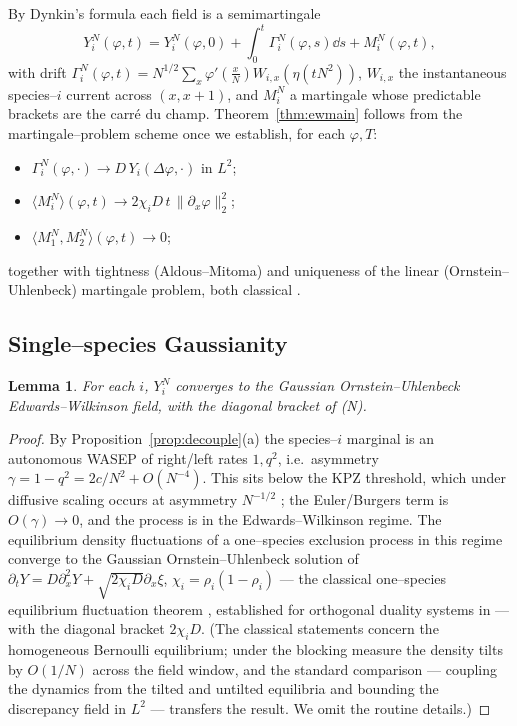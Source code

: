 \documentclass[11pt]{article}
\theoremstyle{plain}
\newtheorem{lemma}[theorem]{Lemma}
\theoremstyle{definition}
\theoremstyle{remark}
\begin{document}
By Dynkin's formula \cite[App.~1.5]{KL} each field is a semimartingale
\begin{equation}\label{eq:dynkin}
  Y_i^N(\varphi,t)=Y_i^N(\varphi,0)+\int_0^t\Gamma_i^N(\varphi,s)\dd s+M_i^N(\varphi,t),
\end{equation}
with drift $\Gamma_i^N(\varphi,t)=N^{1/2}\sum_x\varphi'(\tfrac xN)W_{i,x}(\eta(tN^2))$,
$W_{i,x}$ the instantaneous species--$i$ current across $(x,x{+}1)$, and $M_i^N$ a
martingale whose predictable brackets are the carr\'e du champ. Theorem~\ref{thm:ewmain}
follows from the martingale--problem scheme \cite[Ch.~11]{KL} once we establish, for
each $\varphi,T$:
\begin{itemize}
\item[\textup{(D)}] $\Gamma_i^N(\varphi,\cdot)\to D\,Y_i(\Delta\varphi,\cdot)$ in $L^2$;
\item[\textup{(N)}] $\langle M_i^N\rangle(\varphi,t)\to 2\chi_i D\,t\,\|\partial_x\varphi\|_2^2$;
\item[\textup{(X)}] $\langle M_1^N,M_2^N\rangle(\varphi,t)\to0$;
\end{itemize}
together with tightness (Aldous--Mitoma) and uniqueness of the linear
(Ornstein--Uhlenbeck) martingale problem, both classical \cite[Ch.~11]{KL}.

\subsection{Single--species Gaussianity}
\begin{lemma}\label{lem:gauss}
For each $i$, $Y_i^N$ converges to the Gaussian Ornstein--Uhlenbeck
Edwards--Wilkinson field, with the diagonal bracket of \textup{(N)}.
\end{lemma}
\begin{proof}
By Proposition~\ref{prop:decouple}(a) the species--$i$ marginal is an autonomous WASEP
of right/left rates $1,q^2$, i.e.\ asymmetry $\gamma=1-q^2=2c/N^2+O(N^{-4})$. This sits
below the KPZ threshold, which under diffusive scaling occurs at asymmetry $N^{-1/2}$
\cite{GJ}; the Euler/Burgers term is $O(\gamma)\to0$, and the process is in the
Edwards--Wilkinson regime. The equilibrium density fluctuations of a one--species
exclusion process in this regime converge to the Gaussian Ornstein--Uhlenbeck solution
of $\partial_tY=D\partial_x^2Y+\sqrt{2\chi_i D}\partial_x\xi$, $\chi_i=\rho_i(1-\rho_i)$
--- the classical one--species equilibrium fluctuation theorem \cite[Ch.~11]{KL},
established for orthogonal duality systems in \cite{ACR2} --- with the diagonal bracket
$2\chi_i D$. (The classical statements concern the homogeneous Bernoulli equilibrium;
under the blocking measure the density tilts by $O(1/N)$ across the field window, and
the standard comparison --- coupling the dynamics from the tilted and untilted
equilibria and bounding the discrepancy field in $L^2$ --- transfers the result. We
omit the routine details.)
\end{proof}
\end{document}
